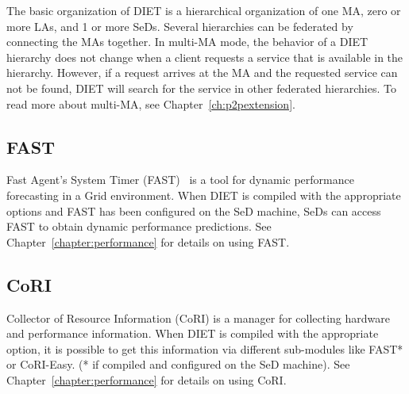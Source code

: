 The basic organization of DIET is a hierarchical organization of one
MA, zero or more LAs, and 1 or more SeDs. Several hierarchies can be
federated by connecting the MAs together. In multi-MA mode, the
behavior of a DIET hierarchy does not change when a client requests
a service that is available in the hierarchy.  However, if a request
arrives at the MA and the requested service can not be found, DIET
will search for the service in other federated hierarchies.
To read more about multi-MA, see Chapter~\ref{ch:p2pextension}.

\subsection{FAST}
\label{sub:fast}

Fast Agent's System Timer (FAST)~\cite{Qui02} is a tool for dynamic
performance forecasting in a Grid environment.  When DIET is
compiled with the appropriate options and FAST has been configured
on the SeD machine, SeDs can access FAST to obtain dynamic
performance predictions.  See Chapter~\ref{chapter:performance} for details
on using FAST.

\subsection{CoRI}
\label{sub:cori}

Collector of Resource Information (CoRI) is a manager for collecting
hardware and performance information.  When DIET is compiled with
the appropriate option, it is possible to get this information via
different sub-modules like FAST* or CoRI-Easy. (* if compiled and
configured on the SeD machine). See Chapter~\ref{chapter:performance}
for details on using CoRI.



